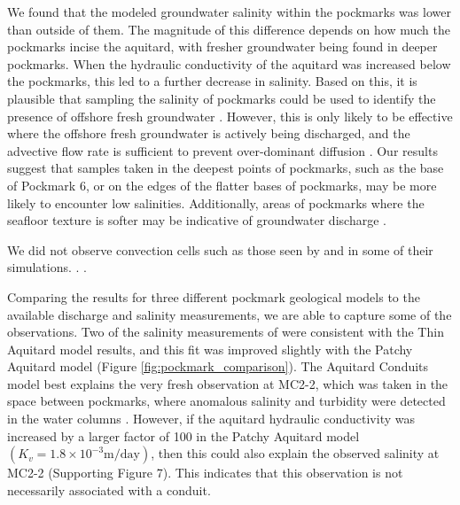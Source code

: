 \documentclass[draft, 10pt]{agujournal2019}
\begin{document}
We found that the modeled groundwater salinity within the pockmarks was lower than outside of them. The magnitude of this difference depends on how much the pockmarks incise the aquitard, with fresher groundwater being found in deeper pockmarks. When the hydraulic conductivity of the aquitard was increased below the pockmarks, this led to a further decrease in salinity. Based on this, it is plausible that sampling the salinity of pockmarks could be used to identify the presence of offshore fresh groundwater \cite{hoffmann_fresh_2023, hoffmann_complex_2020}. However, this is only likely to be effective where the offshore fresh groundwater is actively being discharged, and the advective flow rate is sufficient to prevent over-dominant diffusion \cite{micallef_offshore_2021}. Our results suggest that samples taken in the deepest points of pockmarks, such as the base of Pockmark 6, or on the edges of the flatter bases of pockmarks, may be more likely to encounter low salinities. Additionally, areas of pockmarks where the seafloor texture is softer may be indicative of groundwater discharge \cite{harding_characteristics_2000, hoffmann_fresh_2023}.

We did not observe convection cells such as those seen by  and  in some of their simulations.  \cite{greskowiak_tideinduced_2014}.  \cite{simmons_variable-density_2001}. \cite{kaleris_modelling_2002}

Comparing the results for three different pockmark geological models to the available discharge and salinity measurements, we are able to capture some of the observations. Two of the salinity measurements of  were consistent with the Thin Aquitard model results, and this fit was improved slightly with the Patchy Aquitard model (Figure \ref{fig:pockmark_comparison}). The Aquitard Conduits model best explains the very fresh observation at MC2-2, which was taken in the space between pockmarks, where anomalous salinity and turbidity were detected in the water columns \cite{hoffmann_fresh_2023}. However, if the aquitard hydraulic conductivity was increased by a larger factor of 100 in the Patchy Aquitard model $(K_v=1.8\times10^{-3} \mathrm{m/day})$, then this could also explain the observed salinity at MC2-2  (Supporting Figure 7). This indicates that this observation is not necessarily associated with a conduit.
\end{document}
